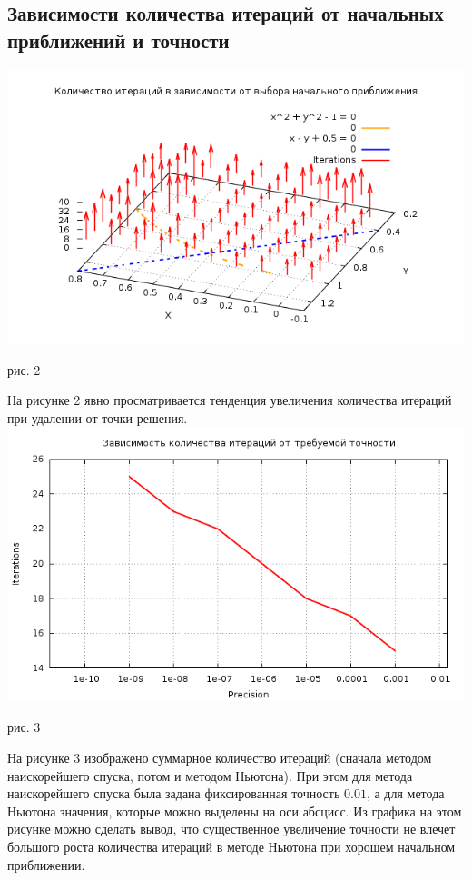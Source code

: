 \documentclass[a4paper, 12pt]{article}
\begin{document}
\subsection*{Зависимости количества итераций от начальных приближений и точности}
\vfil
	\includegraphics[width=\linewidth]{p0.png}\\
	\begin{center}
		рис. 2\\
	\end{center}
\vfil
	На рисунке 2 явно просматривается тенденция увеличения количества итераций при удалении от точки решения.\\
\newpage
\vfil
\includegraphics[width=\linewidth]{eps.png}
	\begin{center}
		рис. 3\\
	\end{center}
\vfil
На рисунке 3 изображено суммарное количество итераций (сначала методом наискорейшего спуска, потом и методом Ньютона). При этом для метода наискорейшего спуска была
задана фиксированная точность $0.01$, а для метода Ньютона значения, которые можно выделены на оси абсцисс. Из графика на этом рисунке можно сделать вывод, что существенное увеличение точности
не влечет большого роста количества итераций в методе Ньютона при хорошем начальном приближении.
\newpage
\end{document}
